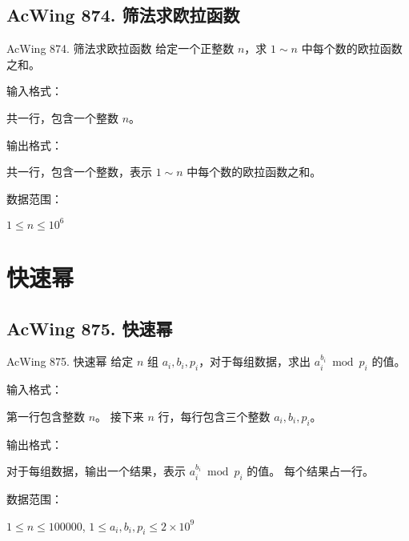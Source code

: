 \subsection{AcWing 874. 筛法求欧拉函数}
\begin{titledbox}{AcWing 874. 筛法求欧拉函数}
    给定一个正整数 $n$，求 $1 \sim n$ 中每个数的欧拉函数之和。

    输入格式：

    共一行，包含一个整数 $n$。

    输出格式：

    共一行，包含一个整数，表示 $1 \sim n$ 中每个数的欧拉函数之和。

    数据范围：

    $1 \le n \le 10^6$

    \begin{inputblock}
    \end{inputblock}
    \begin{outputblock}
    \end{outputblock}
\end{titledbox}


\section{快速幂}

\subsection{AcWing 875. 快速幂}
\begin{titledbox}{AcWing 875. 快速幂}
    给定 $n$ 组 $a_i, b_i, p_i$，对于每组数据，求出 $a_i ^ {b_i} \bmod p_i$ 的值。

    输入格式：

    第一行包含整数 $n$。 接下来 $n$ 行，每行包含三个整数 $a_i, b_i, p_i$。

    输出格式：

    对于每组数据，输出一个结果，表示 $a_i ^ {b_i} \bmod p_i$ 的值。 每个结果占一行。

    数据范围：

    $1 \le n \le 100000$, $1 \le a_i,b_i,p_i \le 2 \times 10^9$

    \begin{inputblock}
         \\
         \\
    \end{inputblock}
    \begin{outputblock}
         \\
    \end{outputblock}
\end{titledbox}

